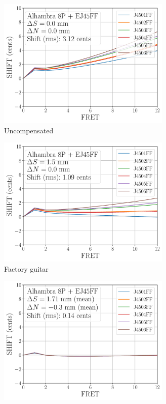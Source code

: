 \begin{figure}
  \centering
  \begin{subfigure}[b]{0.45\textwidth}
   \centering
   \includegraphics[width=3.25in]{../figures/shift_alhambra8p_ej45ff_null}
   \caption{Uncompensated}
   \label{fig:shift_alhambra8p_ej45ff_null}
  \end{subfigure}
  \hspace{0.25in}
  \begin{subfigure}[b]{0.45\textwidth}
   \centering
   \includegraphics[width=3.25in]{../figures/shift_alhambra8p_ej45ff_factory}
   \caption{Factory guitar}
   \label{fig:shift_alhambra8p_ej45ff_factory}
  \end{subfigure}
  \par\vspace{0.25in}
  \begin{subfigure}[b]{0.45\textwidth}
   \centering
   \includegraphics[width=3.25in]{../figures/shift_alhambra8p_ej45ff_full}

\end{subfigure}
\end{figure}
